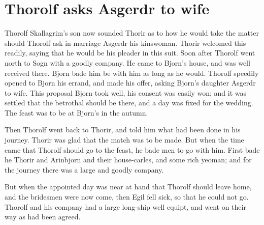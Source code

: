 \chapter{Thorolf asks Asgerdr to wife}

Thorolf Skallagrim's son now sounded Thorir as to how he would take the matter should Thorolf ask in marriage Asgerdr his kinswoman. Thorir welcomed this readily, saying that he would be his pleader in this suit. Soon after Thorolf went north to Sogn with a goodly company. He came to Bjorn's house, and was well received there. Bjorn bade him be with him as long as he would. Thorolf speedily opened to Bjorn his errand, and made his offer, asking Bjorn's daughter Asgerdr to wife. This proposal Bjorn took well, his consent was easily won; and it was settled that the betrothal should be there, and a day was fixed for the wedding. The feast was to be at Bjorn's in the autumn.

Then Thorolf went back to Thorir, and told him what had been done in his journey. Thorir was glad that the match was to be made. But when the time came that Thorolf should go to the feast, he bade men to go with him. First bade he Thorir and Arinbjorn and their house-carles, and some rich yeoman; and for the journey there was a large and goodly company.

But when the appointed day was near at hand that Thorolf should leave home, and the bridesmen were now come, then Egil fell sick, so that he could not go. Thorolf and his company had a large long-ship well equipt, and went on their way as had been agreed.
